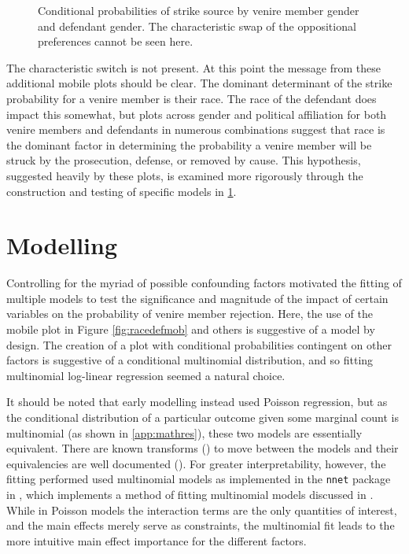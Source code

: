 \begin{figure}[h!]
  \centering
  \caption[Strike Source by Race and Gender (Sunshine)]
  {Conditional probabilities of strike source by venire member gender and defendant gender. The characteristic swap of the
    oppositional preferences cannot be seen here.} \label{fig:gengen}
\end{figure}

The characteristic switch is not present. At this point the message from these additional mobile plots should be clear. The
dominant determinant of the strike probability for a venire member is their race. The race of the defendant does impact this
somewhat, but plots across gender and political affiliation for both venire members and defendants in numerous combinations
suggest that race is the dominant factor in determining the probability a venire member will be struck by the prosecution,
defense, or removed by cause. This hypothesis, suggested heavily by these plots, is examined more rigorously through the
construction and testing of specific models in \ref{sec:mods}.

\section{Modelling} \label{sec:mods}

Controlling for the myriad of possible confounding factors motivated the fitting of multiple models to test the significance and
magnitude of the impact of certain variables on the probability of venire member rejection. Here, the use of the mobile plot in
Figure \ref{fig:racedefmob} and others is suggestive of a model by design. The creation of a plot with conditional probabilities
contingent on other factors is suggestive of a conditional multinomial distribution, and so fitting multinomial log-linear
regression seemed a natural choice.

It should be noted that early modelling instead used Poisson regression, but as the conditional distribution of a particular
outcome given some marginal count is multinomial (as shown in \ref{app:mathres}), these two models are essentially
equivalent. There are known transforms (\cite{baker1994}) to move between the models and their equivalencies are well documented
(\cite{lang1996}). For greater interpretability, however, the fitting performed used multinomial models as implemented in the
\texttt{nnet} package in \Rp, which implements a method of fitting multinomial models discussed in \cite{nnet}. While in Poisson
models the interaction terms are the only quantities of interest, and the main effects merely serve as constraints, the
multinomial fit leads to the more intuitive main effect importance for the different factors.



